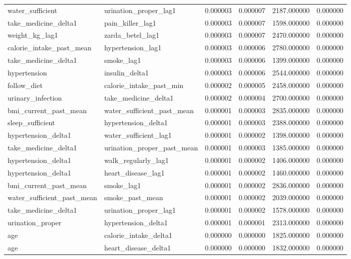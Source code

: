 \begin{longtable}{llrrrr}
water\_sufficient & urination\_proper\_lag1 & 0.000003 & 0.000007 & 2187.000000 & 0.000000 \\
take\_medicine\_delta1 & pain\_killer\_lag1 & 0.000003 & 0.000007 & 1598.000000 & 0.000000 \\
weight\_kg\_lag1 & zarda\_betel\_lag1 & 0.000003 & 0.000007 & 2470.000000 & 0.000000 \\
calorie\_intake\_past\_mean & hypertension\_lag1 & 0.000003 & 0.000006 & 2780.000000 & 0.000000 \\
take\_medicine\_delta1 & smoke\_lag1 & 0.000003 & 0.000006 & 1399.000000 & 0.000000 \\
hypertension & insulin\_delta1 & 0.000003 & 0.000006 & 2544.000000 & 0.000000 \\
follow\_diet & calorie\_intake\_past\_min & 0.000002 & 0.000005 & 2458.000000 & 0.000000 \\
urinary\_infection & take\_medicine\_delta1 & 0.000002 & 0.000004 & 2700.000000 & 0.000000 \\
bmi\_current\_past\_mean & water\_sufficient\_past\_mean & 0.000001 & 0.000003 & 2835.000000 & 0.000000 \\
sleep\_sufficient & hypertension\_delta1 & 0.000001 & 0.000003 & 2388.000000 & 0.000000 \\
hypertension\_delta1 & water\_sufficient\_lag1 & 0.000001 & 0.000002 & 1398.000000 & 0.000000 \\
take\_medicine\_delta1 & urination\_proper\_past\_mean & 0.000001 & 0.000003 & 1385.000000 & 0.000000 \\
hypertension\_delta1 & walk\_regularly\_lag1 & 0.000001 & 0.000002 & 1406.000000 & 0.000000 \\
hypertension\_delta1 & heart\_disease\_lag1 & 0.000001 & 0.000002 & 1460.000000 & 0.000000 \\
bmi\_current\_past\_mean & smoke\_lag1 & 0.000001 & 0.000002 & 2836.000000 & 0.000000 \\
water\_sufficient\_past\_mean & smoke\_past\_mean & 0.000001 & 0.000002 & 2039.000000 & 0.000000 \\
take\_medicine\_delta1 & urination\_proper\_lag1 & 0.000001 & 0.000002 & 1578.000000 & 0.000000 \\
urination\_proper & hypertension\_delta1 & 0.000001 & 0.000001 & 2313.000000 & 0.000000 \\
age & calorie\_intake\_delta1 & 0.000000 & 0.000000 & 1825.000000 & 0.000000 \\
age & heart\_disease\_delta1 & 0.000000 & 0.000000 & 1832.000000 & 0.000000 \\

\end{longtable}
